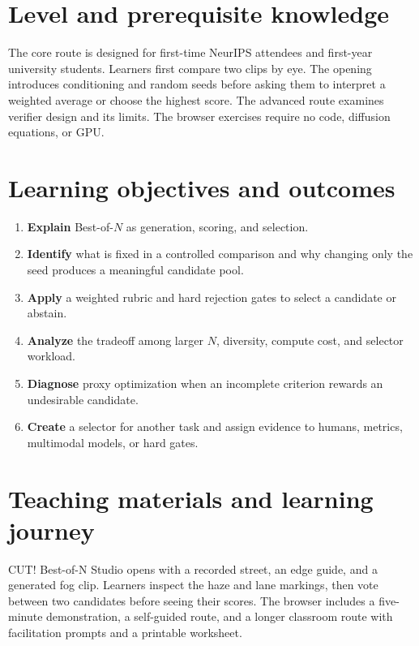\documentclass{article}
\begin{document}
\section{Level and prerequisite knowledge}

The core route is designed for first-time NeurIPS attendees and first-year university students. Learners first compare two clips by eye. The opening introduces conditioning and random seeds before asking them to interpret a weighted average or choose the highest score. The advanced route examines verifier design and its limits. The browser exercises require no code, diffusion equations, or GPU.

\section{Learning objectives and outcomes}

\begin{enumerate}[leftmargin=*, itemsep=0pt, topsep=1pt, parsep=0pt]
  \item \textbf{Explain} Best-of-$N$ as generation, scoring, and selection.
  \item \textbf{Identify} what is fixed in a controlled comparison and why changing only the seed produces a meaningful candidate pool.
  \item \textbf{Apply} a weighted rubric and hard rejection gates to select a candidate or abstain.
  \item \textbf{Analyze} the tradeoff among larger $N$, diversity, compute cost, and selector workload.
  \item \textbf{Diagnose} proxy optimization when an incomplete criterion rewards an undesirable candidate.
  \item \textbf{Create} a selector for another task and assign evidence to humans, metrics, multimodal models, or hard gates.
\end{enumerate}

\section{Teaching materials and learning journey}

CUT! Best-of-N Studio opens with a recorded street, an edge guide, and a generated fog clip. Learners inspect the haze and lane markings, then vote between two candidates before seeing their scores. The browser includes a five-minute demonstration, a self-guided route, and a longer classroom route with facilitation prompts and a printable worksheet.
\end{document}
